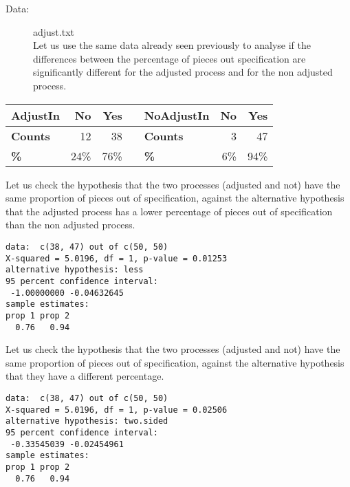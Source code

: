 
\begin{frame} 
  \begin{description}
    \item[Data:] adjust.txt\\
    Let us use the same data already seen previously to analyse if the differences between the percentage of pieces out specification are significantly different for the adjusted process and for the non adjusted process.
  \end{description}
  \begin{center}
    \begin{tabular}{|l|rr|c|l|rr|}
      \hline	
      \textbf{AdjustIn} & \textbf{No} & \textbf{Yes} & & \textbf{NoAdjustIn} &  \textbf{No} & \textbf{Yes} \\
      \hline
      \textbf{Counts} & 12 & 38 & & \textbf{Counts} & 3 & 47 \\
      \textbf{\%} & 24\% & 76\% & & \textbf{\%} & 6\% & 94\% \\
      \hline
    \end{tabular} 
    \end{center}
\end{frame}

\begin{frame}[fragile]
Let us check the hypothesis that the two processes (adjusted and not) have the same proportion of pieces out of specification, against the alternative hypothesis that the adjusted process has a lower percentage of pieces out of specification than the non adjusted process.
  \begin{verbatim}
data:  c(38, 47) out of c(50, 50) 
X-squared = 5.0196, df = 1, p-value = 0.01253
alternative hypothesis: less 
95 percent confidence interval:
 -1.00000000 -0.04632645 
sample estimates:
prop 1 prop 2 
  0.76   0.94 
  \end{verbatim}
\end{frame}

\begin{frame}[fragile]
Let us check the hypothesis that the two processes (adjusted and not) have the same proportion of pieces out of specification, against the alternative hypothesis that they have a different percentage.
  \begin{verbatim}
data:  c(38, 47) out of c(50, 50) 
X-squared = 5.0196, df = 1, p-value = 0.02506
alternative hypothesis: two.sided 
95 percent confidence interval:
 -0.33545039 -0.02454961 
sample estimates:
prop 1 prop 2 
  0.76   0.94
  \end{verbatim}
\end{frame}

